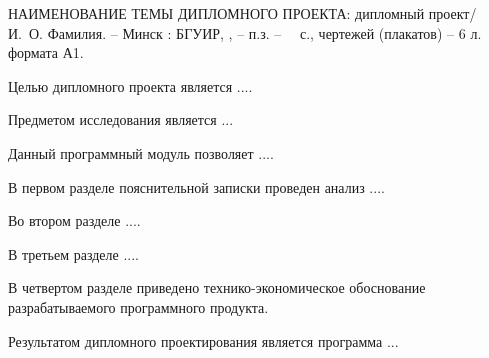 \thispagestyle{empty}

\MakeUppercase{наименование темы дипломного проекта}: дипломный проект/ И.~О. Фамилия. -- Минск : БГУИР, \the\year{}, -- п.з. -- ~\pageref*{LastPage}~с., чертежей (плакатов) -- 6 л. формата А1.

\vspace{4\parsep}


Целью дипломного проекта является ....

Предметом исследования является ...

Данный программный модуль позволяет ....

В первом разделе пояснительной записки проведен анализ ....

Во втором разделе ....

В третьем разделе ....

В четвертом разделе приведено технико-экономическое обоснование разрабатываемого программного продукта.

Результатом дипломного проектирования является программа ...

\clearpage